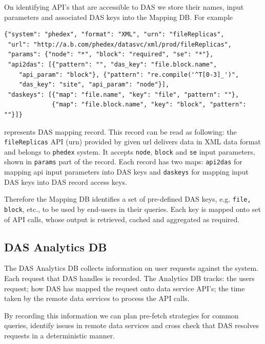 \documentclass[1p,times]{elsarticle}
\begin{document}
On identifying API's that are accessible to DAS we store
their names, input parameters and associated DAS keys
into the Mapping DB. For example
\begin{verbatim}
{"system": "phedex", "format": "XML", "urn": "fileReplicas",
 "url": "http://a.b.com/phedex/datasvc/xml/prod/fileReplicas", 
 "params": {"node": "*", "block": "required", "se": "*"}, 
 "api2das": [{"pattern": "", "das_key": "file.block.name", 
    "api_param": "block"}, {"pattern": "re.compile('^T[0-3]_')", 
    "das_key": "site", "api_param": "node"}], 
 "daskeys": [{"map": "file.name", "key": "file", "pattern": ""}, 
             {"map": "file.block.name", "key": "block", "pattern": ""}]}
\end{verbatim}
represents DAS mapping record.
This record can be read as following:
the \verb+fileReplicas+ API (urn) provided by given url delivers data in
XML data format and belongs to \verb+phedex+ system.
It accepts \verb+node+, \verb+block+ and \verb+se+ input parameters, shown in \verb+params+ part
of the record. Each record has two maps: \verb+api2das+ for mapping api input parameters into
DAS keys and \verb+daskeys+ for mapping input DAS keys into DAS record access keys.


Therefore the Mapping DB identifies a set of pre-defined DAS keys, 
e.g. \verb+file, block+, etc., to be used by end-users in their queries.
Each key is mapped onto set of API calls, whose output is retrieved,
cached and aggregated as required. 

\subsection{DAS Analytics DB}
The DAS Analytics DB collects information on user requests against the system.
Each request that DAS handles is recorded.
The Analytics DB tracks: the users request; how DAS has mapped the request 
onto data service API's; the time taken by the remote data services to 
process the API calls.

By recording this information we can plan pre-fetch strategies for common queries,
identify issues in remote data services and cross check that DAS resolves requests
in a deterministic manner.

\end{document}
